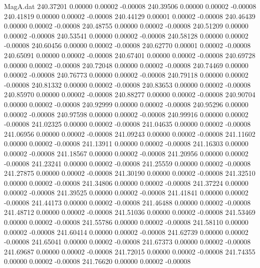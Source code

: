 \begin{filecontents}{MagA.dat}
 240.37201    0.00000    0.00002   -0.00008
 240.39506    0.00000    0.00002   -0.00008
 240.41819    0.00000    0.00002   -0.00008
 240.44129    0.00001    0.00002   -0.00008
 240.46439    0.00000    0.00002   -0.00008
 240.48755    0.00000    0.00002   -0.00008
 240.51209    0.00000    0.00002   -0.00008
 240.53541    0.00000    0.00002   -0.00008
 240.58128    0.00000    0.00002   -0.00008
 240.60456    0.00000    0.00002   -0.00008
 240.62770    0.00001    0.00002   -0.00008
 240.65091    0.00000    0.00002   -0.00008
 240.67401    0.00000    0.00002   -0.00008
 240.69728    0.00000    0.00002   -0.00008
 240.72048    0.00000    0.00002   -0.00008
 240.74469    0.00000    0.00002   -0.00008
 240.76773    0.00000    0.00002   -0.00008
 240.79118    0.00000    0.00002   -0.00008
 240.81332    0.00000    0.00002   -0.00008
 240.83653    0.00000    0.00002   -0.00008
 240.85970    0.00000    0.00002   -0.00008
 240.88277    0.00000    0.00002   -0.00008
 240.90704    0.00000    0.00002   -0.00008
 240.92999    0.00000    0.00002   -0.00008
 240.95296    0.00000    0.00002   -0.00008
 240.97598    0.00000    0.00002   -0.00008
 240.99916    0.00000    0.00002   -0.00008
 241.02325    0.00000    0.00002   -0.00008
 241.04635    0.00000    0.00002   -0.00008
 241.06956    0.00000    0.00002   -0.00008
 241.09243    0.00000    0.00002   -0.00008
 241.11602    0.00000    0.00002   -0.00008
 241.13911    0.00000    0.00002   -0.00008
 241.16303    0.00000    0.00002   -0.00008
 241.18567    0.00000    0.00002   -0.00008
 241.20956    0.00000    0.00002   -0.00008
 241.23241    0.00000    0.00002   -0.00008
 241.25559    0.00000    0.00002   -0.00008
 241.27875    0.00000    0.00002   -0.00008
 241.30190    0.00000    0.00002   -0.00008
 241.32510    0.00000    0.00002   -0.00008
 241.34806    0.00000    0.00002   -0.00008
 241.37224    0.00000    0.00002   -0.00008
 241.39525    0.00000    0.00002   -0.00008
 241.41841    0.00000    0.00002   -0.00008
 241.44173    0.00000    0.00002   -0.00008
 241.46488    0.00000    0.00002   -0.00008
 241.48712    0.00000    0.00002   -0.00008
 241.51036    0.00000    0.00002   -0.00008
 241.53469    0.00000    0.00002   -0.00008
 241.55786    0.00000    0.00002   -0.00008
 241.58110    0.00000    0.00002   -0.00008
 241.60414    0.00000    0.00002   -0.00008
 241.62739    0.00000    0.00002   -0.00008
 241.65041    0.00000    0.00002   -0.00008
 241.67373    0.00000    0.00002   -0.00008
 241.69687    0.00000    0.00002   -0.00008
 241.72015    0.00000    0.00002   -0.00008
 241.74355    0.00000    0.00002   -0.00008
 241.76620    0.00000    0.00002   -0.00008

\end{filecontents}
